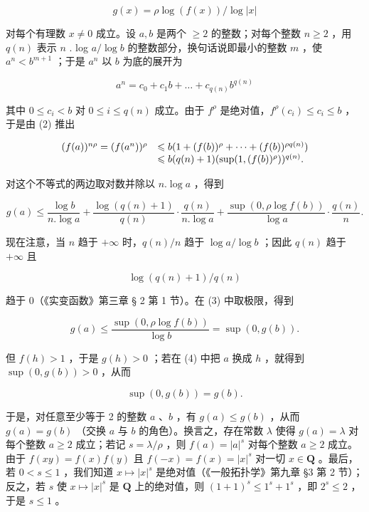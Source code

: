 \[
g (x) = \rho \log (f (x)) / \log | x |
\]

对每个有理数 \(x \neq 0\) 成立。设 \(a, b\) 是两个 \(\geqslant 2\) 的整数；对每个整数 \(n \geqslant 2\) ，用 \(q(n)\) 表示 \(n\) . log \(a / \log b\) 的整数部分，换句话说即最小的整数 \(m\) ，使 \(a^n < b^{m+1}\) ；于是 \(a^n\) 以 \(b\) 为底的展开为

\[
a ^ {n} = c _ {0} + c _ {1} b + \dots + c _ {q (n)} b ^ {q (n)}\tag{2}
\]

其中 \(0 \leqslant c_{i} < b\) 对 \(0 \leqslant i \leqslant q(n)\) 成立。由于 \(f^{\rho}\) 是绝对值，\(f^{\rho}(c_{i}) \leqslant c_{i} \leqslant b\) ，于是由 (2) 推出

\[
\begin{array}{r l} (f (a)) ^ {n \rho} = (f (a ^ {n})) ^ {\rho} & \leqslant b (1 + (f (b)) ^ {\rho} + \dots + (f (b)) ^ {\rho q (n)}) \\ & \leqslant b (q (n) + 1) (\sup (1, (f (b)) ^ {\rho})) ^ {q (n)}. \end{array}
\]

对这个不等式的两边取对数并除以 \(n.\log a\) ，得到

\[
g (a) \leqslant \frac {\log b}{n . \log a} + \frac {\log (q (n) + 1)}{q (n)} \cdot \frac {q (n)}{n . \log a} + \frac {\sup (0 , \rho \log f (b))}{\log a} \cdot \frac {q (n)}{n}.\tag{3}
\]

现在注意，当 \(n\) 趋于 \(+\infty\) 时，\(q(n) / n\) 趋于 \(\log a / \log b\) ；因此 \(q(n)\) 趋于 \(+\infty\) 且

\[
\log (q (n) + 1) / q (n)
\]

趋于 0（《实变函数》第三章 § 2 第 1 节）。在 (3) 中取极限，得到

\[
g (a) \leqslant \frac {\sup (0 , \rho \log f (b))}{\log b} = \sup (0, g (b)).\tag{4}
\]

但 \(f(h) > 1\) ，于是 \(g(h) > 0\) ；若在 (4) 中把 \(a\) 换成 \(h\) ，就得到 \(\sup(0, g(b)) > 0\) ，从而

\[
\sup (0, g (b)) = g (b).
\]

于是，对任意至少等于 2 的整数 \(a\) 、\(b\) ，有 \(g(a) \leqslant g(b)\) ，从而 \(g(a) = g(b)\) （交换 \(a\) 与 \(b\) 的角色）。换言之，存在常数 \(\lambda\) 使得 \(g(a) = \lambda\) 对每个整数 \(a \geqslant 2\) 成立；若记 \(s = \lambda / \rho\) ，则 \(f(a) = |a|^s\) 对每个整数 \(a \geqslant 2\) 成立。由于 \(f(xy) = f(x)f(y)\) 且 \(f(-x) = f(x) = |x|^s\) 对一切 \(x \in \mathbf{Q}\) 。最后，若 \(0 < s \leqslant 1\) ，我们知道 \(x \mapsto |x|^s\) 是绝对值（《一般拓扑学》第九章 §3 第 2 节）；反之，若 \(s\) 使 \(x \mapsto |x|^s\) 是 \(\mathbf{Q}\) 上的绝对值，则 \((1 + 1)^s \leqslant 1^s + 1^s\) ，即 \(2^s \leqslant 2\) ，于是 \(s \leqslant 1\) 。

